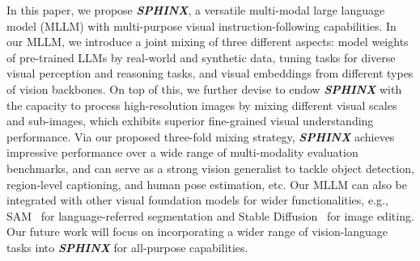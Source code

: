 \documentclass{article} \usepackage{iclr2024_conference,times}
\begin{document}
In this paper, we propose \textcolor{Goldenrod3}{\textbf{\textit{SPHINX}}}, a versatile multi-modal large language model (MLLM) with multi-purpose visual instruction-following capabilities. In our MLLM, we introduce a joint mixing of three different aspects: model weights of pre-trained LLMs by real-world and synthetic data, tuning tasks for diverse visual perception and reasoning tasks, and visual embeddings from different types of vision backbones. On top of this, we further devise to endow \textcolor{Goldenrod3}{\textbf{\textit{SPHINX}}} with the capacity to process high-resolution images by mixing different visual scales and sub-images, which exhibits superior fine-grained visual understanding performance.
Via our proposed three-fold mixing strategy, \textcolor{Goldenrod3}{\textbf{\textit{SPHINX}}} achieves impressive performance over a wide range of multi-modality evaluation benchmarks, and can serve as a strong vision generalist to tackle object detection, region-level captioning, and human pose estimation, etc. Our MLLM can also be integrated with other visual foundation models for wider functionalities, e.g., SAM~\citep{kirillov2023segment} for language-referred segmentation and Stable Diffusion~\citep{rombach2021highresolution} for image editing. Our future work will focus on incorporating a wider range of vision-language tasks into \textcolor{Goldenrod3}{\textbf{\textit{SPHINX}}} for all-purpose capabilities.











 



\end{document}
